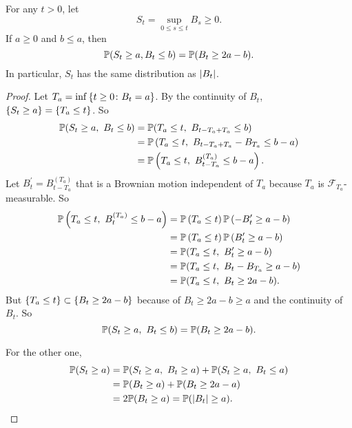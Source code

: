 \begin{thm}
    For any $t > 0$, let 
    \begin{equation*}
        S_t = \sup_{0\leq s \leq t}B_s \geq 0.
    \end{equation*}
    If $a \geq 0$ and $b \leq a$, then
    \begin{equation*}
        \mathbb{P}(S_t \geq a, B_t \leq b) = \mathbb{P}(B_t \geq 2a - b).
    \end{equation*}
    In particular, $S_t$ has the same distribution as $\left\lvert B_t\right\lvert$.
\end{thm}
\begin{proof}
    Let $T_a = \inf\left\{t \geq 0\colon B_t = a\right\}$. By the continuity of $B_t$, $\left\{S_t \geq a\right\} = \left\{T_a \leq t\right\}$. So
    \begin{align*}
        \mathbb{P}(S_t \geq a,~ B_t \leq b) &= \mathbb{P}(T_a \leq t,~B_{t - T_a + T_a} \leq b) \\
        &= \mathbb{P}\left(T_a \leq t,~B_{t - T_a + T_a} - B_{T_a} \leq b-a\right) \\
        &= \mathbb{P}\left(T_a \leq t,~B^{(T_a)}_{t-T_a} \leq b-a\right).
    \end{align*}
    Let $B^\prime_t = B^{(T_a)}_{t-T_a}$ that is a Brownian motion independent of $T_a$ because $T_a$ is $\mathcal{F}_{T_a}$-measurable. So
    \begin{align*}
        \mathbb{P}\left(T_a \leq t,~B^{(T_a)}_t \leq b-a\right) &= \mathbb{P}\left(T_a \leq t\right)\mathbb{P}\left(-B^\prime_t \geq a-b\right) \\
        &= \mathbb{P}\left(T_a \leq t\right)\mathbb{P}\left(B^\prime_t \geq a-b\right) \\
        &= \mathbb{P}(T_a \leq t,~B^\prime_t \geq a-b) \\
        &= \mathbb{P}(T_a \leq t,~B_t - B_{T_a} \geq a-b) \\
        &= \mathbb{P}(T_a \leq t,~B_t \geq 2a-b).
    \end{align*}
    But $\left\{T_a \leq t\right\} \subset \left\{B_t \geq 2a-b\right\}$ because of $B_t \geq 2a-b \geq a$ and the continuity of $B_t$. So
    \begin{equation*}
        \mathbb{P}(S_t \geq a,~ B_t \leq b) = \mathbb{P}(B_t \geq 2a-b).
    \end{equation*}

    \noindent For the other one,
    \begin{align*}
        \mathbb{P}(S_t \geq a) &= \mathbb{P}(S_t \geq a,~ B_t \geq a) + \mathbb{P}(S_t \geq a,~ B_t \leq a) \\
        &=  \mathbb{P}(B_t \geq a) + \mathbb{P}(B_t \geq 2a-a) \\
        &= 2\mathbb{P}(B_t \geq a) = \mathbb{P}(\left\lvert B_t\right\lvert \geq a). \qedhere
    \end{align*}
\end{proof}
